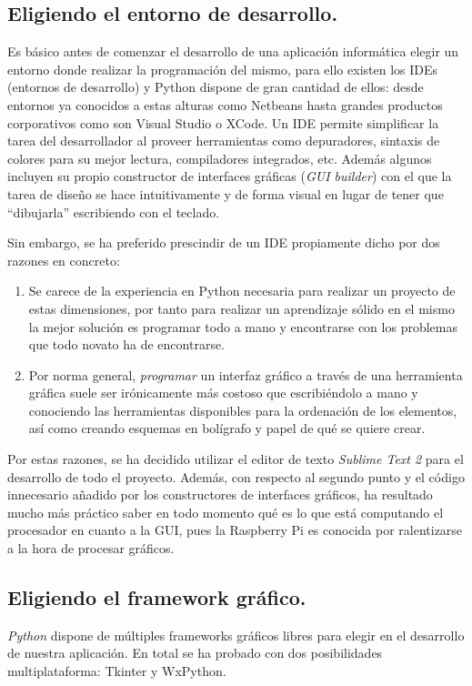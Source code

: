 \subsection{Eligiendo el entorno de desarrollo.}
	Es básico antes de comenzar el desarrollo de una aplicación informática elegir un entorno donde realizar la programación del mismo, para ello existen los IDEs (entornos de desarrollo) y Python dispone de gran cantidad de ellos\cite{wikipython_ide}: desde entornos ya conocidos a estas alturas como Netbeans hasta grandes productos corporativos como son Visual Studio o XCode. Un IDE permite simplificar la tarea del desarrollador al proveer herramientas como depuradores, sintaxis de colores para su mejor lectura, compiladores integrados, etc. Además algunos incluyen su propio constructor de interfaces gráficas (\emph{GUI builder}) con el que la tarea de diseño se hace intuitivamente y de forma visual en lugar de tener que ``dibujarla'' escribiendo con el teclado.
	
	Sin embargo, se ha preferido prescindir de un IDE propiamente dicho por dos razones en concreto:
\begin{enumerate}
	\item Se carece de la experiencia en Python necesaria para realizar un proyecto de estas dimensiones, por tanto para realizar un aprendizaje sólido en el mismo la mejor solución es programar todo a mano y encontrarse con los problemas que todo novato ha de encontrarse.
	\item Por norma general, \emph{programar} un interfaz gráfico a través de una herramienta gráfica suele ser irónicamente más costoso que escribiéndolo a mano y conociendo las herramientas disponibles para la ordenación de los elementos, así como creando esquemas en bolígrafo y papel de qué se quiere crear. 
\end{enumerate}

Por estas razones, se ha decidido utilizar el editor de texto \emph{Sublime Text 2} para el desarrollo de todo el proyecto. Además, con respecto al segundo punto y el código innecesario añadido por los constructores de interfaces gráficos, ha resultado mucho más práctico saber en todo momento qué es lo que está computando el procesador en cuanto a la GUI, pues la Raspberry Pi es conocida por ralentizarse a la hora de procesar gráficos.

\subsection{Eligiendo el framework gráfico.}
	\emph{Python} dispone de múltiples frameworks gráficos\cite{wikipython_guiprogramming} libres para elegir en el desarrollo de nuestra aplicación. En total se ha probado con dos posibilidades multiplataforma: Tkinter y WxPython.

